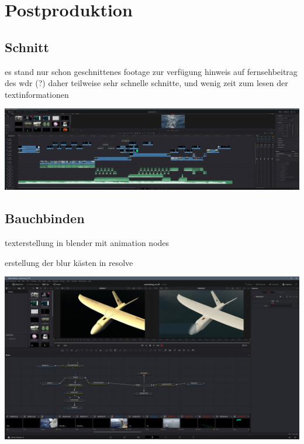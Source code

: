 \chapter{Postproduktion}

\section{Schnitt}

es stand nur schon geschnittenes footage zur verfügung
hinweis auf fernsehbeitrag des wdr (?)
daher teilweise sehr schnelle schnitte, und wenig zeit zum lesen der textinformationen

\includegraphics[width=\textwidth]{gfx/post/resolve2.jpg}

\section{Bauchbinden}

texterstellung in blender mit animation nodes

erstellung der blur kästen in resolve

\includegraphics[width=\textwidth]{gfx/post/resolve3.jpg}

